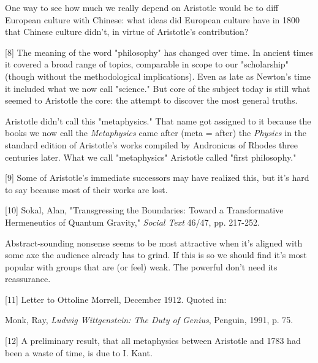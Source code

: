 One way to see how much we
                  really depend on Aristotle would be to diff European culture
                  with Chinese: what ideas did European culture have in 1800
                  that Chinese culture didn't, in virtue of Aristotle's
                  contribution?

[8] The meaning of the word "philosophy" has changed over time.
                  In ancient times it covered a broad range of topics,
                  comparable in scope to our "scholarship" (though without the
                  methodological implications). Even as late as Newton's time it
                  included what we now call "science." But core of the subject
                  today is still what seemed to Aristotle the core: the attempt
                  to discover the most general truths.

Aristotle
                  didn't call this "metaphysics." That name got assigned to it
                  because the books we now call the \emph{Metaphysics} came
                  after (meta = after) the \emph{Physics} in the standard
                  edition of Aristotle's works compiled by Andronicus of Rhodes
                  three centuries later. What we call "metaphysics" Aristotle
                  called "first philosophy."

[9] Some of Aristotle's immediate successors may have realized
                  this, but it's hard to say because most of their works are
                  lost.

[10] Sokal, Alan, "Transgressing the Boundaries: Toward a
                  Transformative Hermeneutics of Quantum Gravity,"
                  \emph{Social Text} 46/47, pp. 217-252.

Abstract-sounding
                  nonsense seems to be most attractive when it's aligned with
                  some axe the audience already has to grind. If this is so we
                  should find it's most popular with groups that are (or feel)
                  weak. The powerful don't need its reassurance.

[11] Letter to Ottoline Morrell, December 1912. Quoted in:

Monk,
                  Ray, \emph{Ludwig Wittgenstein: The Duty of Genius}, Penguin,
                  1991, p. 75.

[12] A preliminary result, that all metaphysics between
                  Aristotle and 1783 had been a waste of time, is due to I.
                  Kant.

